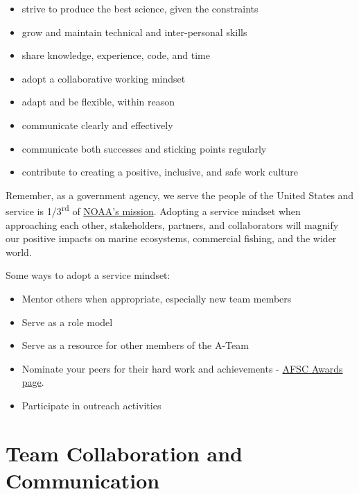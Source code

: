 \documentclass[
  letterpaper,
  DIV=11,
  numbers=noendperiod]{scrreprt}
\providecommand{\tightlist}{%
  \setlength{\itemsep}{0pt}\setlength{\parskip}{0pt}}\usepackage{longtable,booktabs,array}
\begin{document}
\begin{itemize}
\tightlist
\item
  strive to produce the best science, given the constraints\\
\item
  grow and maintain technical and inter-personal skills
\item
  share knowledge, experience, code, and time
\item
  adopt a collaborative working mindset\\
\item
  adapt and be flexible, within reason\\
\item
  communicate clearly and effectively
\item
  communicate both successes and sticking points regularly\\
\item
  contribute to creating a positive, inclusive, and safe work culture
\end{itemize}

Remember, as a government agency, we serve the people of the United
States and service is 1/3\textsuperscript{rd} of
\href{https://www.noaa.gov/our-mission-and-vision}{NOAA's mission}.
Adopting a service mindset when approaching each other, stakeholders,
partners, and collaborators will magnify our positive impacts on marine
ecosystems, commercial fishing, and the wider world.

Some ways to adopt a service mindset:

\begin{itemize}
\tightlist
\item
  Mentor others when appropriate, especially new team members\\
\item
  Serve as a role model\\
\item
  Serve as a resource for other members of the A-Team\\
\item
  Nominate your peers for their hard work and achievements -
  \href{https://sites.google.com/noaa.gov/myafsc/administrative/workforce-management/awards}{AFSC
  Awards page}.
\item
  Participate in outreach activities
\end{itemize}

\hypertarget{team-collaboration-and-communication}{%
\section{Team Collaboration and
Communication}\label{team-collaboration-and-communication}}
\end{document}
